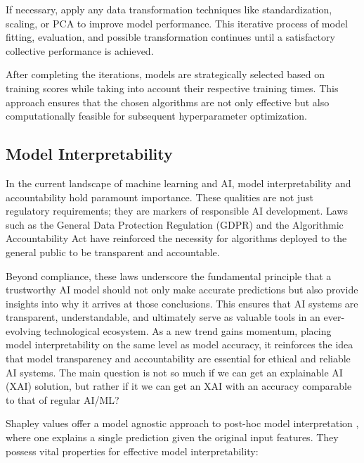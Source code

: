\documentclass{IEEEtran}
\begin{document}
            If necessary, apply any data transformation techniques like standardization, scaling, or PCA to improve model performance. This iterative process of model fitting, evaluation, and possible transformation continues until a satisfactory collective performance is achieved.

            After completing the iterations, models are strategically selected based on training scores while taking into account their respective training times. This approach ensures that the chosen algorithms are not only effective but also computationally feasible for subsequent hyperparameter optimization.

        \subsection{Model Interpretability} \label{sec:interpretability}

            In the current landscape of machine learning and AI, model interpretability and accountability hold paramount importance. These qualities are not just regulatory requirements; they are markers of responsible AI development. Laws such as the General Data Protection Regulation (GDPR) \cite{gdpr-act} and the Algorithmic Accountability Act \cite{govinfo-2022} have reinforced the necessity for algorithms deployed to the general public to be transparent and accountable.

            Beyond compliance, these laws underscore the fundamental principle that a trustworthy AI model should not only make accurate predictions but also provide insights into why it arrives at those conclusions. This ensures that AI systems are transparent, understandable, and ultimately serve as valuable tools in an ever-evolving technological ecosystem. As a new trend gains momentum, placing model interpretability on the same level as model accuracy, it reinforces the idea that model transparency and accountability are essential for ethical and reliable AI systems. The main question is not so much if we can get an explainable AI (XAI) solution, but rather if it we can get an XAI with an accuracy comparable to that of regular AI/ML? \cite{angelov2021explainable}

            Shapley values offer a model agnostic approach to post-hoc model interpretation \cite{chen2023algorithms}, where one explains a single prediction given the original input features. They possess vital properties for effective model interpretability:
\end{document}
